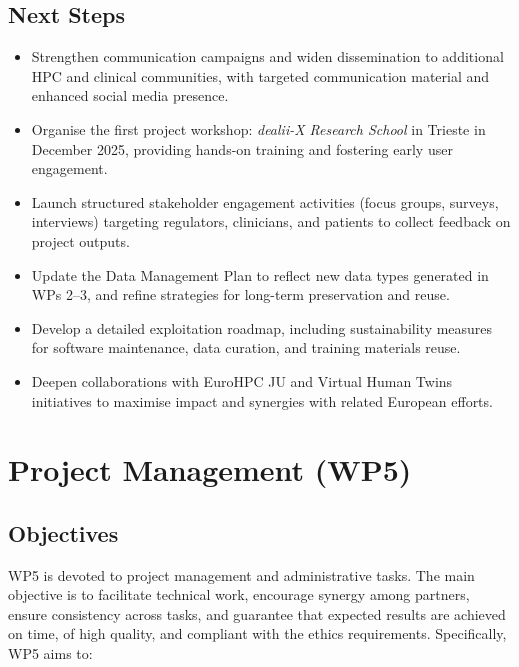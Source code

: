 \documentclass[a4paper,12pt, numbers]{article}
\begin{document}
\subsection{Next Steps} %

\begin{itemize}[left=1em, itemsep=0pt, topsep=0pt]
\item Strengthen communication campaigns and widen dissemination to additional HPC and clinical communities, with targeted communication material and enhanced social media presence.
\item Organise the first project workshop: \textit{dealii-X Research School} in Trieste in December 2025, providing hands-on training and fostering early user engagement.
\item Launch structured stakeholder engagement activities (focus groups, surveys, interviews) targeting regulators, clinicians, and patients to collect feedback on project outputs.
\item Update the Data Management Plan to reflect new data types generated in WPs 2–3, and refine strategies for long-term preservation and reuse.
\item Develop a detailed exploitation roadmap, including sustainability measures for software maintenance, data curation, and training materials reuse.
\item Deepen collaborations with EuroHPC JU and Virtual Human Twins initiatives to maximise impact and synergies with related European efforts.
\end{itemize}






\newpage

\section{{Project Management (WP5)}}
\label{sec:wp5_management}

\subsection{Objectives}

WP5 is devoted to project management and administrative tasks. The main objective is to facilitate technical work, encourage synergy among partners, ensure consistency across tasks, and guarantee that expected results are achieved on time, of high quality, and compliant with the ethics requirements. Specifically, WP5 aims to:
\end{document}
